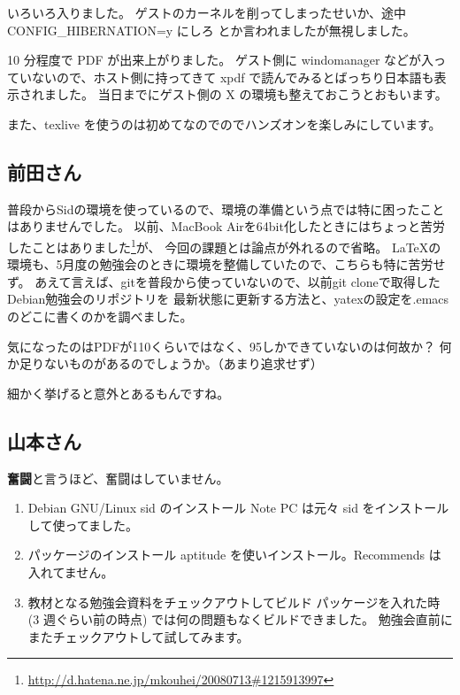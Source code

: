 \documentclass[mingoth,a4paper]{jsarticle}
\begin{document}
いろいろ入りました。
ゲストのカーネルを削ってしまったせいか、途中 CONFIG\_HIBERNATION=y にしろ
とか言われましたが無視しました。
\begin{commandline}
\end{commandline}

10 分程度で PDF が出来上がりました。
ゲスト側に windomanager などが入っていないので、ホスト側に持ってきて
xpdf で読んでみるとばっちり日本語も表示されました。
当日までにゲスト側の X の環境も整えておこうとおもいます。

また、texlive を使うのは初めてなのでのでハンズオンを楽しみにしています。

\subsection{前田さん}
普段からSidの環境を使っているので、環境の準備という点では特に困ったことはありませんでした。
以前、MacBook Airを64bit化したときにはちょっと苦労したことはありました\footnote{\url{http://d.hatena.ne.jp/mkouhei/20080713\#1215913997}}が、
今回の課題とは論点が外れるので省略。
\LaTeX の環境も、5月度の勉強会のときに環境を整備していたので、こちらも特に苦労せず。
あえて言えば、gitを普段から使っていないので、以前git cloneで取得したDebian勉強会のリポジトリを
最新状態に更新する方法と、yatexの設定を.emacsのどこに書くのかを調べました。

気になったのはPDFが110くらいではなく、95しかできていないのは何故か？
何か足りないものがあるのでしょうか。（あまり追求せず）

細かく挙げると意外とあるもんですね。


\subsection{山本さん}
{\bf 奮闘}と言うほど、奮闘はしていません。

\begin{enumerate}
\item Debian GNU/Linux sid のインストール
Note PC は元々 sid をインストールして使ってました。

\item パッケージのインストール
aptitude を使いインストール。Recommends は入れてません。

\item 教材となる勉強会資料をチェックアウトしてビルド
パッケージを入れた時 (3 週ぐらい前の時点) では何の問題もなくビルドできました。
勉強会直前にまたチェックアウトして試してみます。
\end{enumerate}
\end{document}
